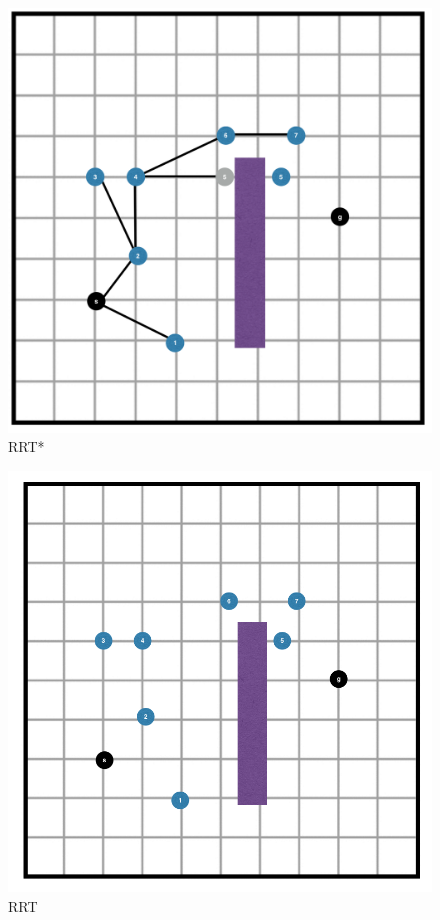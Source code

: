 \documentclass[11pt]{article}
\begin{document}
    \begin{figure}[ht]
    \centering
    \includegraphics[scale=0.35]{figures/finalfinalfinalrrtstarsoln}
    \caption{RRT*}
    \end{figure}
\else
    \bigskip
    \begin{figure}[ht]
    \centering
    \includegraphics[scale=0.5]{figures/finalfinalrrtproblem}
    \caption{RRT}
    \end{figure}
    
\end{document}
